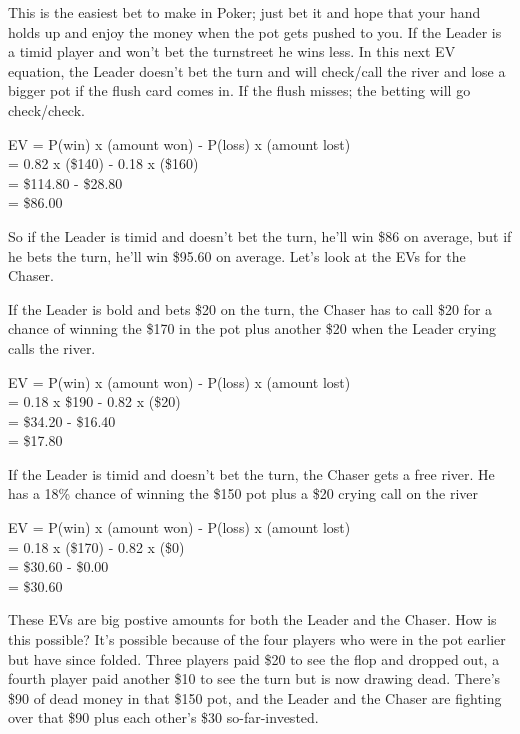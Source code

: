 This is the easiest bet to make in Poker; just bet it and hope that
your hand holds up and enjoy the money when the pot gets pushed to
you. If the Leader is a timid player and won't bet the turnstreet
he wins less. In this next EV equation, the Leader doesn't bet the
turn and will check/call the river and lose a bigger pot if the flush
card comes in. If the flush misses; the betting will go check/check.

EV = P(win) x (amount won) - P(loss) x (amount lost) \\
   = 0.82   x (\$140)      - 0.18    x (\$160) \\
   = \$114.80 - \$28.80 \\
   = \$86.00

So if the Leader is timid and doesn't bet the turn, he'll win \$86 on
average, but if he bets the turn, he'll win \$95.60 on average. Let's
look at the EVs for the Chaser.

If the Leader is bold and bets \$20 on the turn, the Chaser
has to call \$20 for a chance of winning the \$170 in the pot plus
another \$20 when the Leader crying calls the river.

EV = P(win) x (amount won) - P(loss) x (amount lost) \\
   = 0.18 x \$190 - 0.82 x (\$20) \\
   = \$34.20 - \$16.40 \\
   = \$17.80

If the Leader is timid and doesn't bet the turn, the Chaser gets a
free river. He has a 18\% chance of winning the \$150 pot plus a \$20
crying call on the river

EV = P(win) x (amount won) - P(loss) x (amount lost) \\
   = 0.18 x (\$170) - 0.82 x (\$0) \\
   = \$30.60 - \$0.00 \\
   = \$30.60

These EVs are big postive amounts for both the Leader and the
Chaser. How is this possible? It's possible because of the four
players who were in the pot earlier but have since folded. Three
players paid \$20 to see the flop and dropped out, a fourth player
paid another \$10 to see the turn but is now drawing dead. There's
\$90 of dead money in that \$150 pot, and the Leader and the Chaser
are fighting over that \$90 plus each other's \$30 so-far-invested.


